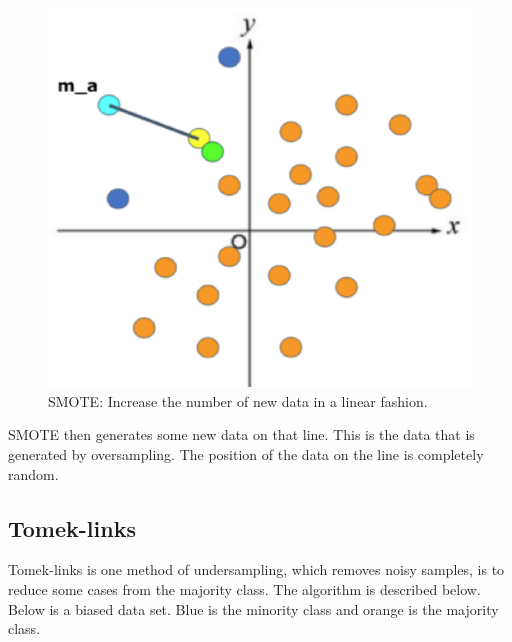 \begin{center}
    \begin{figure}[ht]
        \caption{SMOTE: Increase the number of new data in a linear fashion.}
        \label{tab:team-rating-features}
        \begin{center}
            \includegraphics[scale=0.6]{image/smote5.eps}
        \end{center}
    \end{figure}
\end{center}

SMOTE then generates some new data on that line. This is the data that is generated by oversampling. The position of the data on the line is completely random. 

\clearpage
\subsection{Tomek-links}
Tomek-links is one method of undersampling, which removes noisy samples, is to reduce some cases from the majority class\cite{TomekLinks}.
The algorithm is described below. Below is a biased data set. Blue is the minority class  and orange is the majority class.

